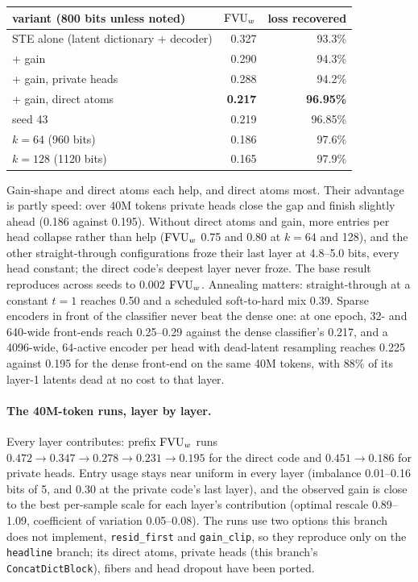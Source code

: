 \begin{center}\small
\begin{tabular}{@{}lrr@{}}
\toprule
variant (800 bits unless noted) & $\mathrm{FVU}_w$ & loss recovered \\
\midrule
STE alone (latent dictionary + decoder) & 0.327 & 93.3\% \\
+ gain & 0.290 & 94.3\% \\
+ gain, private heads & 0.288 & 94.2\% \\
+ gain, direct atoms & \textbf{0.217} & \textbf{96.95\%} \\
\quad seed 43 & 0.219 & 96.85\% \\
\quad $k{=}64$ (960 bits) & 0.186 & 97.6\% \\
\quad $k{=}128$ (1120 bits) & 0.165 & 97.9\% \\
\bottomrule
\end{tabular}
\end{center}

Gain-shape and direct atoms each help, and direct atoms most. Their
advantage is partly speed: over 40M tokens private heads close the gap and
finish slightly ahead (0.186 against 0.195). Without direct atoms and
gain, more entries per head collapse rather than help ($\mathrm{FVU}_w$ 0.75 and 0.80
at $k{=}64$ and 128), and the other straight-through configurations froze
their last layer at 4.8--5.0 bits, every head constant; the direct code's
deepest layer never froze. The base result reproduces across seeds to
0.002 $\mathrm{FVU}_w$. Annealing matters: straight-through at a constant $t{=}1$
reaches 0.50 and a scheduled soft-to-hard mix 0.39. Sparse encoders in
front of the classifier never beat the dense one: at one epoch, 32- and
640-wide front-ends reach 0.25--0.29 against the dense classifier's 0.217,
and a 4096-wide, 64-active encoder per
head with dead-latent resampling reaches 0.225 against 0.195 for the dense
front-end on the same 40M tokens, with 88\% of its layer-1 latents dead at
no cost to that layer.

\paragraph{The 40M-token runs, layer by layer.} Every layer contributes:
prefix $\mathrm{FVU}_w$ runs $0.472 \to 0.347 \to 0.278 \to 0.231 \to 0.195$ for the
direct code and $0.451 \to 0.186$ for private heads. Entry usage stays
near uniform in every layer (imbalance 0.01--0.16 bits of 5, and 0.30 at
the private code's last layer), and the observed gain is close to the
best per-sample scale for each layer's contribution (optimal rescale
0.89--1.09, coefficient of variation 0.05--0.08). The runs use two options
this branch does not implement, \texttt{resid\_first} and
\texttt{gain\_clip}, so they reproduce only on the \texttt{headline}
branch; its direct atoms, private heads (this branch's
\texttt{ConcatDictBlock}), fibers and head dropout have been ported.

